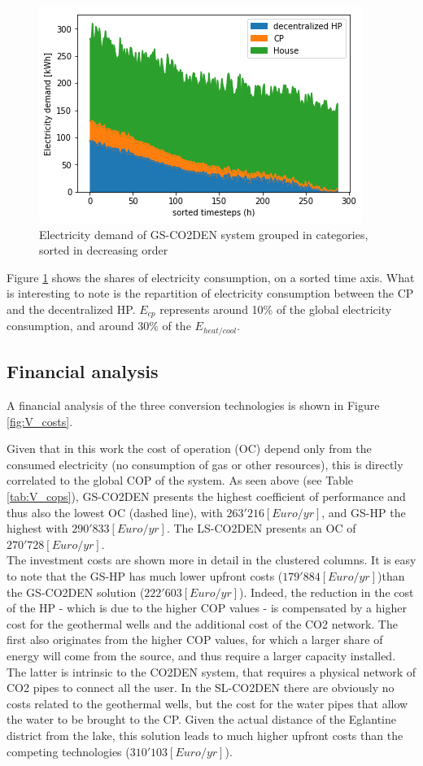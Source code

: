 \documentclass{article}
\begin{document}



\begin{figure}[tph]
	\centering
	\includegraphics[width=0.5\linewidth]{Images/V_CO2_eldem_sorted}
	\caption{Electricity demand of GS-CO2DEN system grouped in categories, sorted in decreasing order}
	\label{fig:gsco2_el}
\end{figure}
Figure \ref{fig:gsco2_el} shows the shares of electricity consumption, on a sorted time axis. What is interesting to note is the repartition of electricity consumption between the CP and the decentralized HP. $E_{cp}$ represents around 10\% of the global electricity consumption, and around 30\% of the $E_{heat/cool}$.

\subsection{Financial analysis}

A financial analysis of the three conversion technologies is shown in Figure \ref{fig:V_costs}. 

Given that in this work the cost of operation (OC) depend only from the consumed electricity (no consumption of gas or other resources), this is directly correlated to the global COP of the system. As seen above (see Table \ref{tab:V_cops}), GS-CO2DEN presents the highest coefficient of performance and thus also the lowest OC (dashed line), with $263'216[Euro/yr]$, and GS-HP the highest with $290'833[Euro/yr]$. The LS-CO2DEN presents an OC of $270'728[Euro/yr]$.\\

The investment costs are shown more in detail in the clustered columns. It is easy to note that the GS-HP has much lower upfront costs ($179'884[Euro/yr]$)than the GS-CO2DEN solution ($222'603[Euro/yr]$). Indeed, the reduction in the cost of the HP - which is due to the higher COP values - is compensated by a higher cost for the geothermal wells and the additional cost of the CO2 network. The first also originates from the higher COP values, for which a larger share of energy will come from the source, and thus require a larger capacity installed. The latter is intrinsic to the CO2DEN system, that requires a physical network of CO2 pipes to connect all the user. In the SL-CO2DEN there are obviously no costs related to the geothermal wells, but the cost for the water pipes that allow the water to be brought to the CP. Given the actual distance of the Eglantine district from the lake, this solution leads to much higher upfront costs than the competing technologies ($310'103[Euro/yr]$).\\
\end{document}

